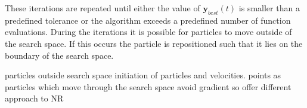 \documentclass[12pt,oneside,openany,a4paper, %
english, %
masters-t, goldenblock]{usthesis}
\begin{document}
These iterations are repeated until either the value of $\bm{y}_{best}(t)$ is smaller than a predefined tolerance or the algorithm exceeds a predefined number of function evaluations. During the iterations it is possible for particles to move outside of the search space. If this occurs the particle is repositioned such that it lies on the boundary of the search space. 



particles outside search space
initiation of particles and velocities.
points as particles which move through the search space
avoid gradient so offer different approach to NR















\end{document}

